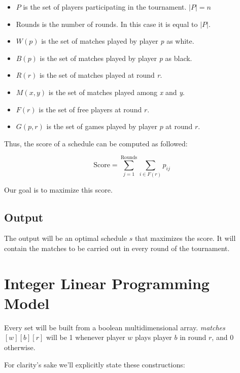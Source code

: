 \documentclass[a4paper, 10pt]{article}
\begin{document}
\begin{itemize}
    \item $P$ is the set of players participating in the tournament. $|P| = n$
    \item Rounds is the number of rounds. In this case it is equal to $|P|$.
    \item $W(p)$ is the set of matches played by player \textit{p} as white.
    \item $B(p)$ is the set of matches played by player \textit{p} as black.
    \item $R(r)$  is the set of matches played at round \textit{r}.
    \item $M(x, y)$  is the set of matches played among \textit{x} and \textit{y}.
    \item $F(r)$ is the set of free players at round $r$.
    \item $G(p,r)$ is the set of games played by player $p$ at round $r$.
\end{itemize}

Thus, the score of a schedule can be computed as followed:

$$
\displaystyle
    \text{Score} = \sum_{j = 1}^{\text{Rounds}} \sum_{i \in F(r)}  p_{ij}
$$


Our goal is to maximize this score.






\subsection{Output}
The output will be an optimal schedule $s$ that maximizes the score. It will contain the matches to be carried out in every round of the tournament.

\section{Integer Linear Programming Model}
Every set will be built from a boolean multidimensional array. \textit{matches}$[w][b][r]$ will be 1 whenever player $w$ plays player $b$ in round $r$, and 0 otherwise.


For clarity's sake we'll explicitly state these constructions:
\end{document}

